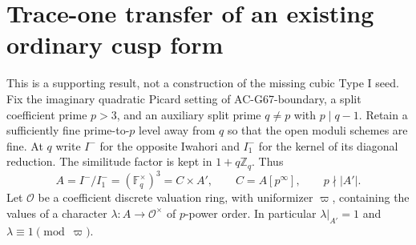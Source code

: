 \section{Trace-one transfer of an existing ordinary cusp form}
\label{sec:cubic-tame-cusp-transfer}

This is a supporting result, not a construction of the missing
cubic Type I seed.  Fix the imaginary quadratic Picard setting of
AC-G67-boundary, a split coefficient prime $p>3$, and an auxiliary
split prime $q\ne p$ with $p\mid q-1$.  Retain a sufficiently fine
prime-to-$p$ level away from $q$ so that the open moduli schemes
are fine.  At $q$ write $I^-$ for the opposite Iwahori and $I_1^-$
for the kernel of its diagonal reduction.  The similitude factor
is kept in $1+q\mathbb Z_q$.  Thus
\[
 A=I^-/I_1^-=(\mathbb F_q^\times)^3=C\times A',
 \qquad C=A[p^\infty],\qquad p\nmid |A'|.
                                                        \tag{CT.1}
\]
Let $\mathcal O$ be a coefficient discrete valuation ring,
with uniformizer $\varpi$, containing the values of a character
$\lambda:A\to\mathcal O^\times$ of $p$-power order.  In
particular $\lambda|_{A'}=1$ and $\lambda\equiv1\pmod\varpi$.

